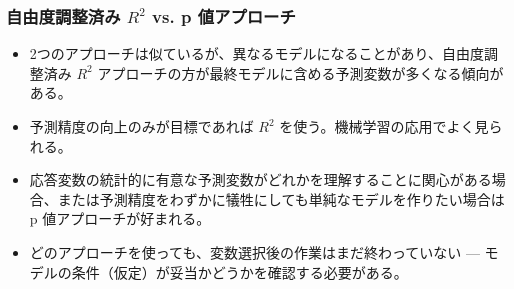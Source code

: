 
\begin{frame}
\frametitle{自由度調整済み $R^2$ vs. p 値アプローチ}

\begin{itemize}

\item 2つのアプローチは似ているが、異なるモデルになることがあり、自由度調整済み $R^2$ アプローチの方が最終モデルに含める予測変数が多くなる傾向がある。

\item 予測精度の向上のみが目標であれば $R^2$ を使う。機械学習の応用でよく見られる。

\item 応答変数の統計的に有意な予測変数がどれかを理解することに関心がある場合、または予測精度をわずかに犠牲にしても単純なモデルを作りたい場合は p 値アプローチが好まれる。

\item どのアプローチを使っても、変数選択後の作業はまだ終わっていない --- モデルの条件（仮定）が妥当かどうかを確認する必要がある。

\end{itemize}

\end{frame}

